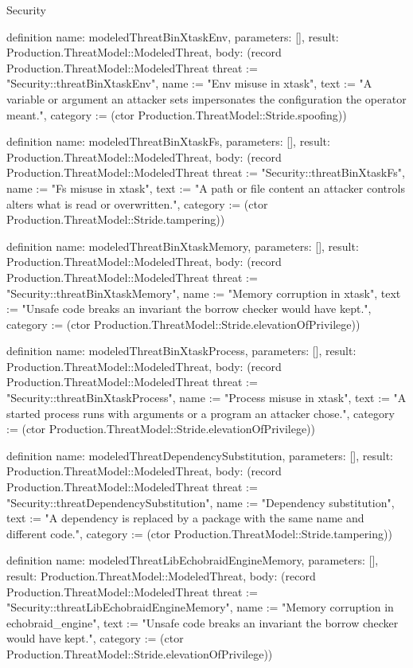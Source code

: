 \begin{lexlean}{Security}
\begin{semanticmodule}
definition{
  name: modeledThreatBinXtaskEnv,
  parameters: [],
  result: Production.ThreatModel::ModeledThreat,
  body: (record Production.ThreatModel::ModeledThreat {threat := "Security::threatBinXtaskEnv", name := "Env misuse in xtask", text := "A variable or argument an attacker sets impersonates the configuration the operator meant.", category := (ctor Production.ThreatModel::Stride.spoofing)})
}

definition{
  name: modeledThreatBinXtaskFs,
  parameters: [],
  result: Production.ThreatModel::ModeledThreat,
  body: (record Production.ThreatModel::ModeledThreat {threat := "Security::threatBinXtaskFs", name := "Fs misuse in xtask", text := "A path or file content an attacker controls alters what is read or overwritten.", category := (ctor Production.ThreatModel::Stride.tampering)})
}

definition{
  name: modeledThreatBinXtaskMemory,
  parameters: [],
  result: Production.ThreatModel::ModeledThreat,
  body: (record Production.ThreatModel::ModeledThreat {threat := "Security::threatBinXtaskMemory", name := "Memory corruption in xtask", text := "Unsafe code breaks an invariant the borrow checker would have kept.", category := (ctor Production.ThreatModel::Stride.elevationOfPrivilege)})
}

definition{
  name: modeledThreatBinXtaskProcess,
  parameters: [],
  result: Production.ThreatModel::ModeledThreat,
  body: (record Production.ThreatModel::ModeledThreat {threat := "Security::threatBinXtaskProcess", name := "Process misuse in xtask", text := "A started process runs with arguments or a program an attacker chose.", category := (ctor Production.ThreatModel::Stride.elevationOfPrivilege)})
}

definition{
  name: modeledThreatDependencySubstitution,
  parameters: [],
  result: Production.ThreatModel::ModeledThreat,
  body: (record Production.ThreatModel::ModeledThreat {threat := "Security::threatDependencySubstitution", name := "Dependency substitution", text := "A dependency is replaced by a package with the same name and different code.", category := (ctor Production.ThreatModel::Stride.tampering)})
}

definition{
  name: modeledThreatLibEchobraidEngineMemory,
  parameters: [],
  result: Production.ThreatModel::ModeledThreat,
  body: (record Production.ThreatModel::ModeledThreat {threat := "Security::threatLibEchobraidEngineMemory", name := "Memory corruption in echobraid_engine", text := "Unsafe code breaks an invariant the borrow checker would have kept.", category := (ctor Production.ThreatModel::Stride.elevationOfPrivilege)})
}


\end{semanticmodule}
\end{lexlean}
